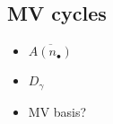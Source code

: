 \documentclass[draft]{article}
\begin{document}
\subsection{MV cycles}
\begin{itemize}
    \item $\overline{A(n_\bullet)}$
    \item $D_\gamma$ 
    \item MV basis?
\end{itemize}
% 
\end{document}
